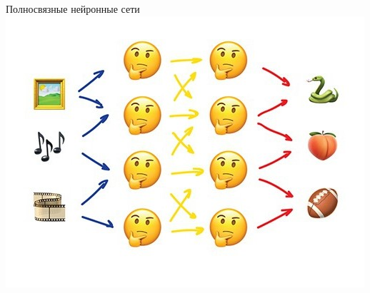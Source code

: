 \documentclass[aspectratio=169]{beamer}
\begin{document}
\begin{frame}{Полносвязные нейронные сети}
    \centering
    \includegraphics[width=.63\linewidth]{graphs/fig14.jpg}
\end{frame}
\end{document}
